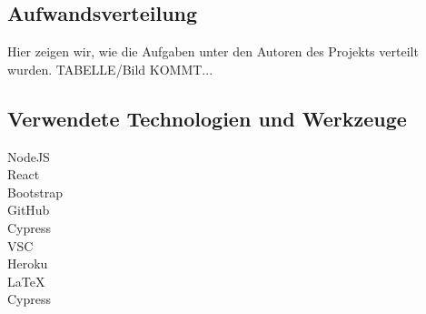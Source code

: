 \subsection{Aufwandsverteilung}\label{subsec_UabsAnhang}
Hier zeigen wir, wie die Aufgaben unter den Autoren des Projekts verteilt wurden.
TABELLE/Bild KOMMT...

\subsection{Verwendete Technologien und Werkzeuge}\label{subsec_UabsAnhang}
NodeJS
\\
React
\\
Bootstrap
\\
GitHub
\\
Cypress
\\
VSC
\\
Heroku
\\
LaTeX
\\
Cypress